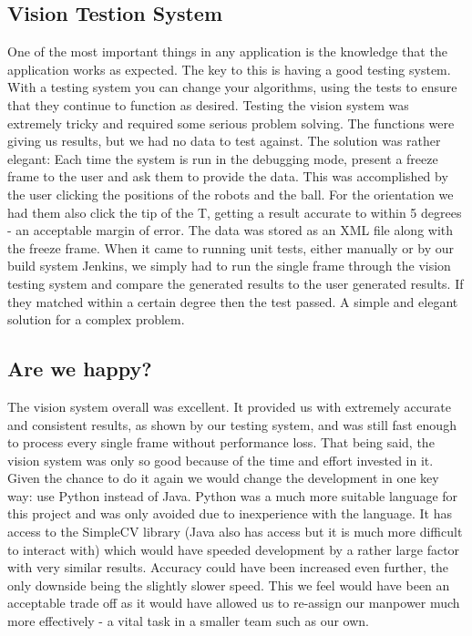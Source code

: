 \subsection{Vision Testion System}

One of the most important things in any application is the knowledge that the application works as expected. The key to this is having a good testing system. With a testing system you can change your algorithms, using the tests to ensure that they continue to function as desired. Testing the vision system was extremely tricky and required some serious problem solving. The functions were giving us results, but we had no data to test against. The solution was rather elegant: Each time the system is run in the debugging mode, present a freeze frame to the user and ask them to provide the data. This was accomplished by the user clicking the positions of the robots and the ball. For the orientation we had them also click the tip of the T, getting a result accurate to within 5 degrees - an acceptable margin of error. The data was stored as an XML file along with the freeze frame. When it came to running unit tests, either manually or by our build system Jenkins, we simply had to run the single frame through the vision testing system and compare the generated results to the user generated results. If they matched within a certain degree then the test passed. A simple and elegant solution for a complex problem. 

\subsection{Are we happy?}

The vision system overall was excellent. It provided us with extremely accurate and consistent results, as shown by our testing system, and was still fast enough to process every single frame without performance loss. That being said, the vision system was only so good because of the time and effort invested in it. Given the chance to do it again we would change the development in one key way: use Python instead of Java. Python was a much more suitable language for this project and was only avoided due to inexperience with the language. It has access to the SimpleCV library (Java also has access but it is much more difficult to interact with) which would have speeded development by a rather large factor with very similar results. Accuracy could have been increased even further, the only downside being the slightly slower speed. This we feel would have been an acceptable trade off as it would have allowed us to re-assign our manpower much more effectively - a vital task in a smaller team such as our own.





